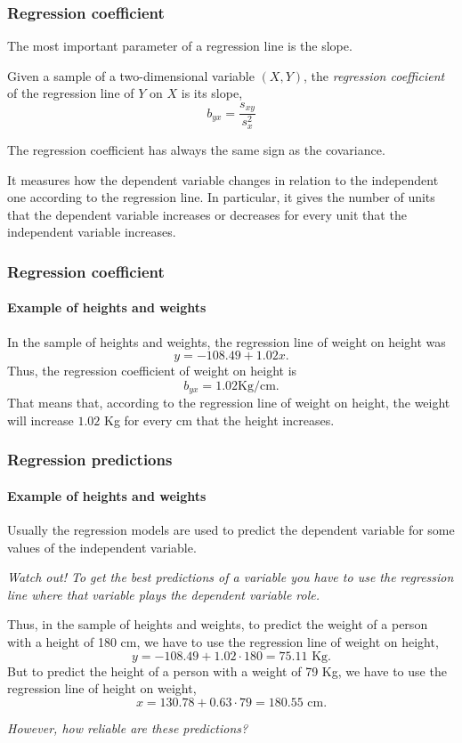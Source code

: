 \begin{frame}
\frametitle{Regression coefficient}
The most important parameter of a regression line is the slope. 

\begin{definition}
Given a sample of a two-dimensional variable $(X,Y)$, the \emph{regression coefficient} of the regression line of $Y$ on
$X$ is its slope,
\[
b_{yx} = \frac{s_{xy}}{s_x^2}
\]
\end{definition}

The regression coefficient has always the same sign as the covariance. 

It measures how the dependent variable changes in relation to the independent one according to the regression line. 
In particular, it gives the number of units that the dependent variable increases or decreases for every unit that the independent variable increases. 
\end{frame}


\begin{frame}
\frametitle{Regression coefficient}
\framesubtitle{Example of heights and weights}
In the sample of heights and weights, the regression line of weight on height was 
\[
y=-108.49 +1.02 x.
\]
Thus, the regression coefficient of weight on height is
\[
b_{yx}= 1.02 \mbox{Kg/cm.}
\]
That means that, according to the regression line of weight on height, the weight will increase $1.02$ Kg for every cm that the height increases. 
\begin{center}

\end{center}
\end{frame}

\begin{frame}
\frametitle{Regression predictions}
\framesubtitle{Example of heights and weights}
Usually the regression models are used to predict the dependent variable for some values of the independent variable.
\begin{center}
\alert{\emph{Watch out! To get the best predictions of a variable you have to use the regression line where that
variable plays the dependent variable role.}}
\end{center}

Thus, in the sample of heights and weights, to predict the weight of a person with a height of 180 cm, we have to use the regression line of weight on height,
\[
y = -108.49 + 1.02 \cdot 180  = 75.11 \mbox{ Kg}.
\]
But to predict the height of a person with a weight of 79 Kg, we have to use the regression line of height on weight, 
\[
x = 130.78 + 0.63\cdot 79 = 180.55 \mbox{ cm}.
\]
\begin{center}
\emph{However, how reliable are these predictions?}
\end{center}
\end{frame}


